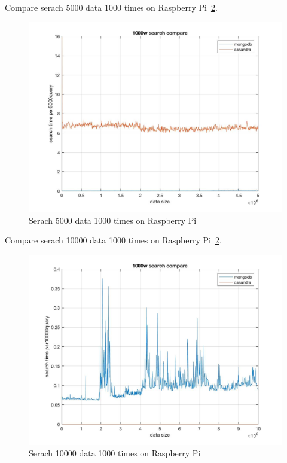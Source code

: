 Compare serach 5000 data 1000 times on Raspberry Pi~\ref{f:fly}.

\begin{figure}[!ht]
  \centering\includegraphics[width=\columnwidth]
  {images/search_comp_5000_pi.jpg}
  \caption{Serach 5000 data 1000 times on Raspberry Pi}\label{f:fly}
\end{figure}

Compare serach 10000 data 1000 times on Raspberry Pi~\ref{f:fly}.

\begin{figure}[!ht]
  \centering\includegraphics[width=\columnwidth]
  {images/search_comp_10000_pi.jpg}
  \caption{Serach 10000 data 1000 times on Raspberry Pi}\label{f:fly}
\end{figure}

